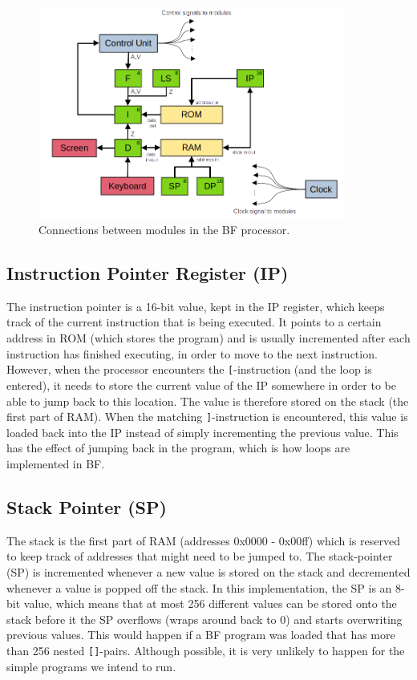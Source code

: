 \begin{figure}[H]
  \centering
  \includegraphics[width=0.9\textwidth]{img/bfcpu_architecture}
  \caption{Connections between modules in the BF processor.}
  \label{fig:architecture}
\end{figure}

\subsection{Instruction Pointer Register (IP)} \label{sec:architecture:ipreg}
The instruction pointer is a 16-bit value, kept in the IP register, which keeps track of the current instruction that is being executed. It points to a certain address in ROM (which stores the program) and is usually incremented after each instruction has finished executing, in order to move to the next instruction. However, when the processor encounters the \texttt{[}-instruction (and the loop is entered), it needs to store the current value of the IP somewhere in order to be able to jump back to this location. The value is therefore stored on the stack (the first part of RAM). When the matching \texttt{]}-instruction is encountered, this value is loaded back into the IP instead of simply incrementing the previous value. This has the effect of jumping back in the program, which is how loops are implemented in BF.

\subsection{Stack Pointer (SP)} \label{sec:architecture:spreg}
The stack is the first part of RAM (addresses 0x0000 - 0x00ff) which is reserved to keep track of addresses that might need to be jumped to. The stack-pointer (SP) is incremented whenever a new value is stored on the stack and decremented whenever a value is popped off the stack. In this implementation, the SP is an 8-bit value, which means that at most 256 different values can be stored onto the stack before it the SP overflows (wraps around back to 0) and starts overwriting previous values. This would happen if a BF program was loaded that has more than 256 nested \texttt{[]}-pairs. Although possible, it is very unlikely to happen for the simple programs we intend to run.

